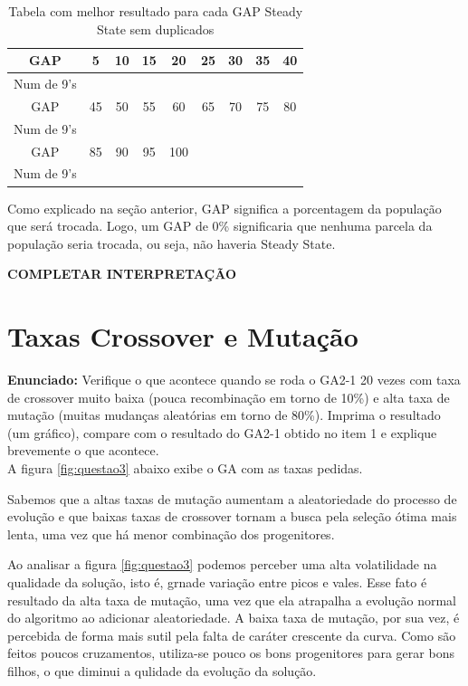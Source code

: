 \documentclass[12pt]{article}
\begin{document}
\begin{table}[H]
	\centering
	\begin{tabular}{|c|c|c|c|c|c|c|c|c|}
		\hline
		GAP & 5 & 10 & 15 & 20 & 25 & 30 & 35 & 40 \\
		\hline
		Num de 9's &  &  &  &  &  &  &  &  \\
		\hline
		GAP & 45 & 50 & 55 & 60 & 65 & 70 & 75 & 80 \\
		\hline
		Num de 9's &  &  &  &  &  &  &  &  \\
		\hline
		GAP & 85 & 90 & 95 & 100 &  &  &  &  \\
		\hline
		Num de 9's &  &  &  &  &  &  &  &  \\
		\hline
	\end{tabular}
	\caption{Tabela com melhor resultado para cada GAP Steady State sem duplicados}
\end{table}

Como explicado na seção anterior, GAP significa a porcentagem da população que será trocada. Logo, um GAP de 0\% significaria que nenhuma parcela da população seria trocada, ou seja, não haveria Steady State. 

\textbf{COMPLETAR INTERPRETAÇÃO}
	
\section{Taxas Crossover e Mutação}
\textbf{Enunciado:}
Verifique o que acontece quando se roda o GA2-1 20 vezes com taxa de crossover muito baixa (pouca recombinação em torno de 10\%) e alta taxa de mutação (muitas mudanças aleatórias em torno de 80\%). Imprima o resultado (um gráfico), compare com o resultado do GA2-1 obtido no item 1 e explique
brevemente o que acontece.\\

A figura \ref{fig:questao3} abaixo exibe o GA com as taxas pedidas.

Sabemos que a altas taxas de mutação aumentam a aleatoriedade do processo de evolução e que baixas taxas de crossover tornam a busca pela seleção ótima mais lenta, uma vez que há menor combinação dos progenitores.

Ao analisar a figura \ref{fig:questao3} podemos perceber uma alta volatilidade na qualidade da solução, isto é, grnade variação entre picos e vales. Esse fato é resultado da alta taxa de mutação, uma vez que ela atrapalha a evolução normal do algoritmo ao adicionar aleatoriedade. A baixa taxa de mutação, por sua vez, é percebida de forma mais sutil pela falta de caráter crescente da curva. Como são feitos poucos cruzamentos, utiliza-se pouco os bons progenitores para gerar bons filhos, o que diminui a qulidade da evolução da solução. 
\end{document}
